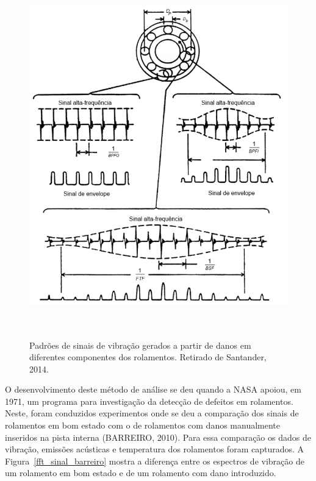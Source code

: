 \documentclass[
	12pt,				
	oneside,			
	a4paper,			
	english,			
	brazil,			
	]{abntex2ppgsi}
\begin{document}
\begin{figure}[!htb]
\centering
\caption {Padrões de sinais de vibração gerados a partir de danos em diferentes componentes dos rolamentos. Retirado de Santander, 2014.}
\includegraphics[width=\textwidth,height=150mm,keepaspectratio]{frequencias_sinais_rolamentos}
\label{frequencias_sinais_rolamentos}
\end{figure}

O desenvolvimento deste método de análise se deu quando a NASA apoiou, em 1971, um programa para investigação da detecção de defeitos em rolamentos. Neste, foram conduzidos experimentos onde se deu a comparação dos sinais de rolamentos em bom estado com o de rolamentos com danos manualmente inseridos na pista interna (BARREIRO, 2010). Para essa comparação os dados de vibração, emissões acústicas e temperatura dos rolamentos foram capturados. A Figura~\ref{fft_sinal_barreiro} mostra a diferença entre os espectros de vibração de um rolamento em bom estado e de um rolamento com dano introduzido.
\end{document}
